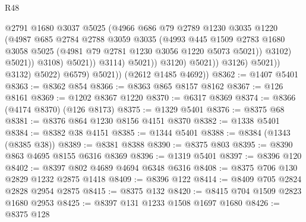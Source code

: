 \begin{lexlean}{R48}
\begin{coremodule}
                                          @2791
                                          @1680
                                          @3037
                                          @5025
                                          (@4966
                                            @686
                                            @79
                                            @2789
                                            @1230
                                            @3035
                                            @1220
                                            (@4987
                                              @685
                                              @2784
                                              @2788
                                              @3059
                                              @3035
                                              (@4993
                                                @445
                                                @1509
                                                @2783
                                                @1680
                                                @3058
                                                @5025
                                                (@4981 @79 @2781 @1230 @3056 @1220 @5073 @5021))
                                              @3102)
                                            @5021))
                                        @3108)
                                      @5021))
                                  @3114)
                                @5021))
                            @3120)
                          @5021))
                      @3126)
                    @5021))
                @3132)
              @5022)
            @6579)
          @5021))
      (@2612 @1485 @4692))
@8362 := @1407 @5401
@8363 := @8362 @854
@8366 := @8363 @865 @8157 @8162
@8367 := @126 @8161
@8369 := @1202 @8367 @1220
@8370 := @6317 @8369
@8374 := @8366 (@4174 @8370) (@126 @8173)
@8375 := @1329 @5401
@8376 := @8375 @68
@8381 := @8376 @864 @1230 @8156 @4151 @8370
@8382 := @1338 @5401
@8384 := @8382 @38 @4151
@8385 := @1344 @5401
@8388 := @8384 (@1343 (@8385 @38))
@8389 := @8381 @8388
@8390 := @8375 @803
@8395 := @8390 @863 @4695 @8155 @6316 @8369
@8396 := @1319 @5401
@8397 := @8396 @120
@8402 := @8397 @802 @4689 @4694 @6348 @6316
@8408 := @8375 @706 @130 @2829 @1232 @2875 @1418
@8409 := @8396 @122
@8414 := @8409 @705 @2824 @2828 @2954 @2875
@8415 := @8375 @132
@8420 := @8415 @704 @1509 @2823 @1680 @2953
@8425 := @8397 @131 @1233 @1508 @1697 @1680
@8426 := @8375 @128

\end{coremodule}
\end{lexlean}
